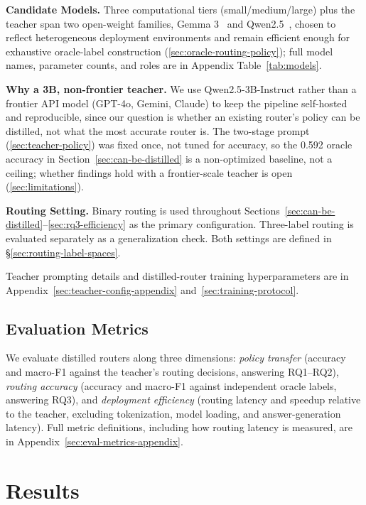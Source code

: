 \documentclass{article}
\begin{document}
\textbf{Candidate Models.} Three computational tiers (small/medium/large) plus the teacher span two open-weight families, Gemma 3~\citep{gemmateam2025gemma3} and Qwen2.5~\citep{qwenteam2024qwen25}, chosen to reflect heterogeneous deployment environments and remain efficient enough for exhaustive oracle-label construction (\ref{sec:oracle-routing-policy}); full model names, parameter counts, and roles are in Appendix Table~\ref{tab:models}.

\textbf{Why a 3B, non-frontier teacher.} We use Qwen2.5-3B-Instruct rather than a frontier API model (GPT-4o, Gemini, Claude) to keep the pipeline self-hosted and reproducible, since our question is whether an existing router's policy can be distilled, not what the most accurate router is. The two-stage prompt (\ref{sec:teacher-policy}) was fixed once, not tuned for accuracy, so the 0.592 oracle accuracy in Section~\ref{sec:can-be-distilled} is a non-optimized baseline, not a ceiling; whether findings hold with a frontier-scale teacher is open (\ref{sec:limitations}).

\textbf{Routing Setting.} Binary routing is used throughout Sections~\ref{sec:can-be-distilled}--\ref{sec:rq3-efficiency} as the primary configuration. Three-label routing is evaluated separately as a generalization check. Both settings are defined in \S\ref{sec:routing-label-spaces}.

Teacher prompting details and distilled-router training hyperparameters are in Appendix~\ref{sec:teacher-config-appendix} and~\ref{sec:training-protocol}.

\subsection{Evaluation Metrics}
\label{sec:evaluation_metrics}

We evaluate distilled routers along three dimensions: \emph{policy
transfer} (accuracy and macro-F1 against the teacher's routing
decisions, answering RQ1--RQ2), \emph{routing accuracy} (accuracy and
macro-F1 against independent oracle labels, answering RQ3), and
\emph{deployment efficiency} (routing latency and speedup relative to
the teacher, excluding tokenization, model loading, and
answer-generation latency). Full metric definitions, including how
routing latency is measured, are in
Appendix~\ref{sec:eval-metrics-appendix}.
\section{Results}
\label{sec:results}
\end{document}
